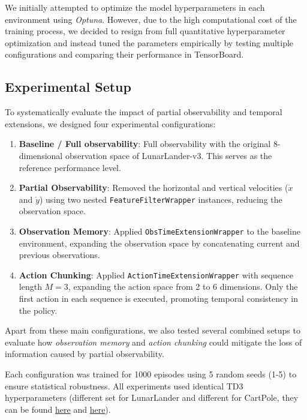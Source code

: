 \documentclass[12pt, a4paper]{article}
\begin{document}
We initially attempted to optimize the model hyperparameters in each environment using \textit{Optuna}. However, due to the high computational cost of the training process, we decided to resign from full quantitative hyperparameter optimization and instead tuned the parameters empirically by testing multiple configurations and comparing their performance in TensorBoard.

\subsection{Experimental Setup}

To systematically evaluate the impact of partial observability and temporal extensions, we designed four experimental configurations:

\begin{enumerate}
	\item \textbf{Baseline / Full observability}: Full observability with the original 8-dimensional observation space of LunarLander-v3. This serves as the reference performance level.

	\item \textbf{Partial Observability}: Removed the horizontal and vertical velocities ($\dot{x}$ and $\dot{y}$) using two nested \texttt{FeatureFilterWrapper} instances, reducing the observation space.

	\item \textbf{Observation Memory}: Applied \texttt{ObsTimeExtensionWrapper} to the baseline environment, expanding the observation space by concatenating current and previous observations.

	\item \textbf{Action Chunking}: Applied \texttt{ActionTimeExtensionWrapper} with sequence length $M=3$, expanding the action space from 2 to 6 dimensions. Only the first action in each sequence is executed, promoting temporal consistency in the policy.
	
\end{enumerate}


Apart from these main configurations, we also tested several combined setups to evaluate how \textit{observation memory} and \textit{action chunking} could mitigate the loss of information caused by partial observability.

Each configuration was trained for 1000 episodes using 5 random seeds (1-5) to ensure statistical robustness. All experiments used identical TD3 hyperparameters (different set for LunarLander and different for CartPole, they can be found \href{https://github.com/KrystianPielat/rl-project-2/blob/master/run_experiments_carpole.py}{here} and \href{https://github.com/KrystianPielat/rl-project-2/blob/master/run_experiments_lunarlander.py}{here}).
\end{document}
